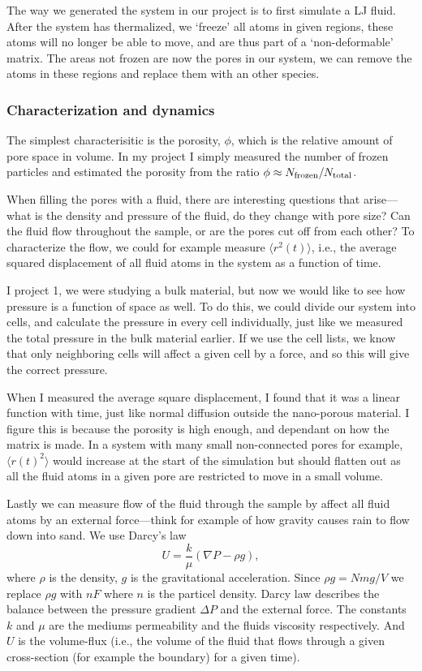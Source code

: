 \documentclass[a4paper, 11pt, notitlepage, english]{article}
\begin{document}
The way we generated the system in our project is to first simulate a LJ fluid. After the system has thermalized, we `freeze' all atoms in given regions, these atoms will no longer be able to move, and are thus part of a `non-deformable' matrix. The areas not frozen are now the pores in our system, we can remove the atoms in these regions and replace them with an other species.

\subsubsection*{Characterization and dynamics}

The simplest characterisitic is the porosity, $\phi$, which is the relative amount of pore space in volume. In my project I simply measured the number of frozen particles and estimated the porosity from the ratio $\phi \approx N_{\rm frozen}/N_{\rm total}$.

When filling the pores with a fluid, there are interesting questions that arise---what is the density and pressure of the fluid, do they change with pore size? Can the fluid flow throughout the sample, or are the pores cut off from each other? To characterize the flow, we could for example measure $\langle r^2(t) \rangle$, i.e., the average squared displacement of all fluid atoms in the system as a function of time.

I project 1, we were studying a bulk material, but now we would like to see how pressure is a function of space as well. To do this, we could divide our system into cells, and calculate the pressure in every cell individually, just like we measured the total pressure in the bulk material earlier. If we use the cell lists, we know that only neighboring cells will affect a given cell by a force, and so this will give the correct pressure.

When I measured the average square displacement, I found that it was a linear function with time, just like normal diffusion outside the nano-porous material. I figure this is because the porosity is high enough, and dependant on how the matrix is made. In a system with many small non-connected pores for example, $\langle r(t)^2 \rangle$ would increase at the start of the simulation but should flatten out as all the fluid atoms in a given pore are restricted to move in a small volume.

Lastly we can measure flow of the fluid through the sample by affect all fluid atoms by an external force---think for example of how gravity causes rain to flow down into sand. We use Darcy's law
$$U = \frac{k}{\mu}(\nabla P - \rho g),$$
where $\rho$ is the density, $g$ is the gravitational acceleration. Since $\rho g = Nmg/V$ we replace $\rho g$ with $nF$ where $n$ is the particel density. Darcy law describes the balance between the pressure gradient $\Delta P$ and the external force. The constants $k$ and $\mu$ are the mediums permeability and the fluids viscosity respectively. And $U$ is the volume-flux (i.e., the volume of the fluid that flows through a given cross-section (for example the boundary) for a given time).
\end{document}
